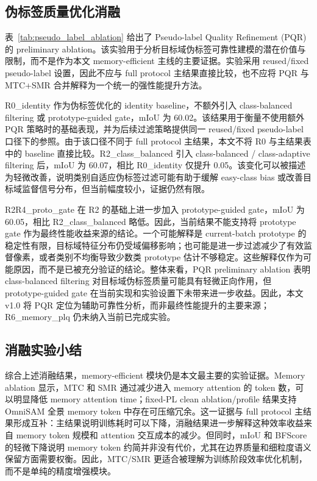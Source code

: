 \subsection{伪标签质量优化消融}


表~\ref{tab:pseudo_label_ablation} 给出了 Pseudo-label Quality Refinement (PQR) 的 preliminary ablation。该实验用于分析目标域伪标签可靠性建模的潜在价值与限制，而不是作为本文 memory-efficient 主线的主要证据。实验采用 reused/fixed pseudo-label 设置，因此不应与 full protocol 主结果直接比较，也不应将 PQR 与 MTC+SMR 合并解释为一个统一的强性能提升方法。

R0\_identity 作为伪标签优化的 identity baseline，不额外引入 class-balanced filtering 或 prototype-guided gate，mIoU 为 60.02。该结果用于衡量不使用额外 PQR 策略时的基础表现，并为后续过滤策略提供同一 reused/fixed pseudo-label 口径下的参照。由于该口径不同于 full protocol 主结果，本文不将 R0 与主结果表中的 baseline 直接比较。R2\_class\_balanced 引入 class-balanced / class-adaptive filtering 后，mIoU 为 60.07，相比 R0\_identity 仅提升 0.05。该变化可以被描述为轻微改善，说明类别自适应伪标签过滤可能有助于缓解 easy-class bias 或改善目标域监督信号分布，但当前幅度较小，证据仍然有限。

R2R4\_proto\_gate 在 R2 的基础上进一步加入 prototype-guided gate，mIoU 为 60.05，相比 R2\_class\_balanced 略低。因此，当前结果不能支持将 prototype gate 作为最终性能收益来源的结论。一个可能解释是 current-batch prototype 的稳定性有限，目标域特征分布仍受域偏移影响；也可能是进一步过滤减少了有效监督像素，或者类别不均衡导致少数类 prototype 估计不够稳定。这些解释仅作为可能原因，而不是已被充分验证的结论。整体来看，PQR preliminary ablation 表明 class-balanced filtering 对目标域伪标签质量可能具有轻微正向作用，但 prototype-guided gate 在当前实现和实验设置下未带来进一步收益。因此，本文 v1.0 将 PQR 定位为辅助可靠性分析，而非最终性能提升的主要来源；R6\_memory\_plq 仍未纳入当前已完成实验。

\subsection{消融实验小结}
综合上述消融结果，memory-efficient 模块仍是本文最主要的实验证据。Memory ablation 显示，MTC 和 SMR 通过减少进入 memory attention 的 token 数，可以明显降低 memory attention time；fixed-PL clean ablation/profile 结果支持 OmniSAM 全景 memory token 中存在可压缩冗余。这一证据与 full protocol 主结果形成互补：主结果说明训练耗时可以下降，消融结果进一步解释这种效率收益来自 memory token 规模和 attention 交互成本的减少。但同时，mIoU 和 BFScore 的轻微下降说明 memory token 约简并非没有代价，尤其在边界质量和细粒度语义保留方面需要权衡。因此，MTC/SMR 更适合被理解为训练阶段效率优化机制，而不是单纯的精度增强模块。

